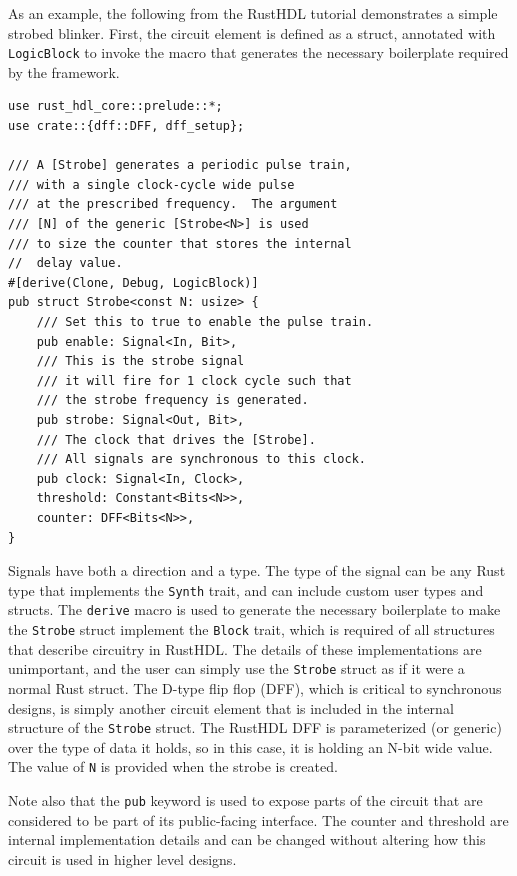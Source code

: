 \documentclass[conference]{IEEEtran}
\begin{document}
As an example, the following from the RustHDL tutorial demonstrates a simple strobed blinker.  First, the
circuit element is defined as a struct, annotated with \verb|LogicBlock| to invoke the macro that generates
the necessary boilerplate required by the framework.

\begin{verbatim}
use rust_hdl_core::prelude::*;
use crate::{dff::DFF, dff_setup};

/// A [Strobe] generates a periodic pulse train, 
/// with a single clock-cycle wide pulse
/// at the prescribed frequency.  The argument 
/// [N] of the generic [Strobe<N>] is used
/// to size the counter that stores the internal 
//  delay value.  
#[derive(Clone, Debug, LogicBlock)]
pub struct Strobe<const N: usize> {
    /// Set this to true to enable the pulse train.
    pub enable: Signal<In, Bit>,
    /// This is the strobe signal 
    /// it will fire for 1 clock cycle such that 
    /// the strobe frequency is generated.
    pub strobe: Signal<Out, Bit>,
    /// The clock that drives the [Strobe].  
    /// All signals are synchronous to this clock.
    pub clock: Signal<In, Clock>,
    threshold: Constant<Bits<N>>,
    counter: DFF<Bits<N>>,
}
\end{verbatim}

Signals have both a direction and a type.  The type of the
signal can be any Rust type that implements the \verb|Synth| trait, and can include custom user
types and structs.  The \verb|derive| macro is used to generate the necessary boilerplate to make the 
\verb|Strobe| struct implement the \verb|Block| trait, which is required of all structures
that describe circuitry in RustHDL.  The details of these implementations are
unimportant, and the user can simply use the \verb|Strobe| struct as if it were a normal Rust struct. 
The D-type flip flop (DFF), which is critical to synchronous designs, is simply another circuit element that
is included in the internal structure of the \verb|Strobe| struct.  The RustHDL DFF is parameterized (or 
generic) over the type of data it holds, so in this case, it is holding an N-bit wide value.  The value of
\verb|N| is provided when the strobe is created.

Note also that the \verb|pub| keyword is used to expose parts of the circuit that are considered to be part
of its public-facing interface.   The counter and threshold are internal implementation details and can be
changed without altering how this circuit is used in higher level designs.
\end{document}
